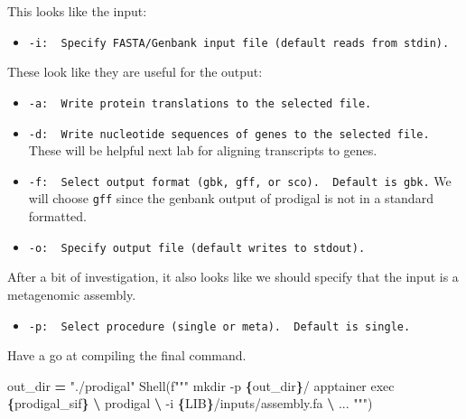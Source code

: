 \documentclass[
]{book}
\newenvironment{Shaded}{\begin{snugshade}}{\end{snugshade}}
\newcommand{\NormalTok}[1]{#1}
\newcommand{\OperatorTok}[1]{\textcolor[rgb]{0.81,0.36,0.00}{\textbf{#1}}}
\newcommand{\SpecialCharTok}[1]{\textcolor[rgb]{0.81,0.36,0.00}{\textbf{#1}}}
\newcommand{\SpecialStringTok}[1]{\textcolor[rgb]{0.31,0.60,0.02}{#1}}
\newcommand{\StringTok}[1]{\textcolor[rgb]{0.31,0.60,0.02}{#1}}
\providecommand{\tightlist}{%
  \setlength{\itemsep}{0pt}\setlength{\parskip}{0pt}}
\begin{document}
This looks like the input:

\begin{itemize}
\tightlist
\item
  \texttt{-i:\ \ Specify\ FASTA/Genbank\ input\ file\ (default\ reads\ from\ stdin).}
\end{itemize}

These look like they are useful for the output:

\begin{itemize}
\tightlist
\item
  \texttt{-a:\ \ Write\ protein\ translations\ to\ the\ selected\ file.}
\item
  \texttt{-d:\ \ Write\ nucleotide\ sequences\ of\ genes\ to\ the\ selected\ file.} These will be helpful next lab for aligning transcripts to genes.
\item
  \texttt{-f:\ \ Select\ output\ format\ (gbk,\ gff,\ or\ sco).\ \ Default\ is\ gbk.} We will choose \texttt{gff} since the genbank output of prodigal is not in a standard formatted.
\item
  \texttt{-o:\ \ Specify\ output\ file\ (default\ writes\ to\ stdout).}
\end{itemize}

After a bit of investigation, it also looks like we should specify that the input is a metagenomic assembly.

\begin{itemize}
\tightlist
\item
  \texttt{-p:\ \ Select\ procedure\ (single\ or\ meta).\ \ Default\ is\ single.}
\end{itemize}

Have a go at compiling the final command.

\begin{Shaded}
\begin{Highlighting}[numbers=left,,]
\NormalTok{out\_dir }\OperatorTok{=} \StringTok{"./prodigal"}
\NormalTok{Shell(}\SpecialStringTok{f"""}
\SpecialStringTok{mkdir {-}p }\SpecialCharTok{\{}\NormalTok{out\_dir}\SpecialCharTok{\}}\SpecialStringTok{/}
\SpecialStringTok{apptainer exec }\SpecialCharTok{\{}\NormalTok{prodigal\_sif}\SpecialCharTok{\}}\SpecialStringTok{ }\OperatorTok{\textbackslash{}}
\SpecialStringTok{    prodigal }\OperatorTok{\textbackslash{}}
\SpecialStringTok{        {-}i }\SpecialCharTok{\{}\NormalTok{LIB}\SpecialCharTok{\}}\SpecialStringTok{/inputs/assembly.fa }\OperatorTok{\textbackslash{}}
\SpecialStringTok{        ...}
\SpecialStringTok{"""}\NormalTok{)}
\end{Highlighting}
\end{Shaded}
\end{document}
